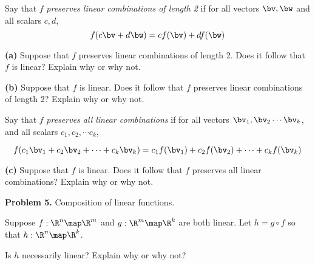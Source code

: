 \documentclass[oneside,12pt]{amsart}
\begin{document}
\smallskip

Say that $f$ \emph{preserves linear combinations of length 2}
if for all vectors $\bv, \bw$ and all scalars $c, d$,
$$f(c\bv + d\bw) = c f(\bv) + d f (\bw)$$

\bigskip

\textbf{(a)} Suppose that $f$ preserves linear combinations of length 2.
Does it follow that $f$ is linear? Explain why or why not.

\bigskip
\bigskip
\bigskip
\bigskip
\bigskip
\bigskip

\textbf{(b)} Suppose that $f$ is linear. Does it follow that $f$ preserves
linear combinations of length 2? Explain why or why not.

\bigskip
\bigskip
\bigskip
\bigskip
\bigskip
\bigskip

Say that $f$ \emph{preserves all linear combinations} if
for all vectors $\bv_1,\bv_2 \cdots \bv_k$, and all scalars
$c_1, c_2, \cdots c_k$,

$$f(c_1 \bv_1 + c_2 \bv_2 + \cdots + c_k \bv_k)
= c_1 f(\bv_1) + c_2 f(\bv_2) + \cdots + c_k f(\bv_k)$$

\bigskip

\textbf{(c)} Suppose that $f$ is linear. Does it follow that $f$ preserves
all linear combinations? Explain why or why not.

\bigskip
\bigskip
\bigskip
\bigskip
\bigskip
\bigskip

\textbf{Problem 5.} Composition of linear functions.

\smallskip

Suppose $f:\R^n\map\R^m$ and $g:\R^m\map\R^k$ are both linear.
Let $h=g\circ f$ so that $h:\R^n\map\R^k$.

\smallskip

Is $h$ necessarily linear? Explain why or why not?
\end{document}
